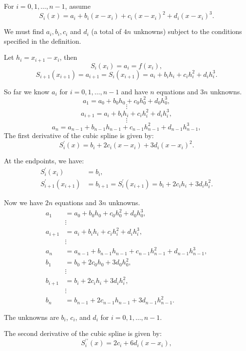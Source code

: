 \documentclass[a4paper]{article}
\begin{document}
\begin{sloppypar}
For \(i=0,1,\ldots,n-1\), assume
\[ S_{i}(x) = a_{i} + b_{i}(x-x_{i}) + c_{i}(x-x_{i})^{2} + d_{i}(x-x_{i})^{3}. \]

We must find \(a_i, b_i, c_i\) and \(d_i\) (a total of \(4n\) unknowns) subject to the conditions specified in the definition.

Let \(h_{i} = x_{i+1} - x_{i}\), then
\[ S_{i}(x_{i}) = a_{i} = f(x_{i}), \]
\[ S_{i+1}(x_{i+1}) = a_{i+1} = S_{i}(x_{i+1}) = a_{i} + b_{i}h_{i} + c_{i}h_{i}^{2} + d_{i}h_{i}^{3}. \]

So far we know \(a_{i}\) for \(i=0,1,\ldots,n-1\) and have \(n\) equations and \(3n\) unknowns.
\[ a_{1} = a_{0} + b_{0}h_{0} + c_{0}h_{0}^{2} + d_{0}h_{0}^{3}, \]
\[ \vdots \]
\[ a_{i+1} = a_{i} + b_{i}h_{i} + c_{i}h_{i}^{2} + d_{i}h_{i}^{3}, \]
\[ \vdots \]
\[ a_{n} = a_{n-1} + b_{n-1}h_{n-1} + c_{n-1}h_{n-1}^{2} + d_{n-1}h_{n-1}^{3}, \]
The first derivative of the cubic spline is given by:
\[ S_i^{\prime}(x) = b_i + 2c_i(x-x_i) + 3d_i(x-x_i)^2. \]

At the endpoints, we have:
$$\begin{aligned}
S_{i}^{\prime}(x_{i}) &= b_{i}, \\
S_{i+1}^{\prime}(x_{i+1}) &= b_{i+1} = S_{i}^{\prime}(x_{i+1}) = b_{i} + 2c_{i}h_{i} + 3d_{i}h_{i}^{2}.
\end{aligned}$$

Now we have $2n$ equations and $3n$ unknowns.
$$
\begin{aligned}
a_{1} &= a_{0} + b_{0}h_{0} + c_{0}h_{0}^{2} + d_{0}h_{0}^{3}, \\
&\vdots \\
a_{i+1} &= a_{i} + b_{i}h_{i} + c_{i}h_{i}^{2} + d_{i}h_{i}^{3}, \\
&\vdots \\
a_{n} &= a_{n-1} + b_{n-1}h_{n-1} + c_{n-1}h_{n-1}^{2} + d_{n-1}h_{n-1}^{3}, \\
b_{1} &= b_{0} + 2c_{0}h_{0} + 3d_{0}h_{0}^{2}, \\
&\vdots \\
b_{i+1} &= b_{i} + 2c_{i}h_{i} + 3d_{i}h_{i}^{2}, \\
&\vdots \\
b_{n} &= b_{n-1} + 2c_{n-1}h_{n-1} + 3d_{n-1}h_{n-1}^{2}.
\end{aligned}
$$

The unknowns are \(b_{i}\), \(c_{i}\), and \(d_{i}\) for \(i = 0, 1, \ldots, n-1\).

The second derivative of the cubic spline is given by:
\[ S_i^{\prime\prime}(x) = 2c_i + 6d_i(x-x_i), \]


\end{sloppypar}
\end{document}
